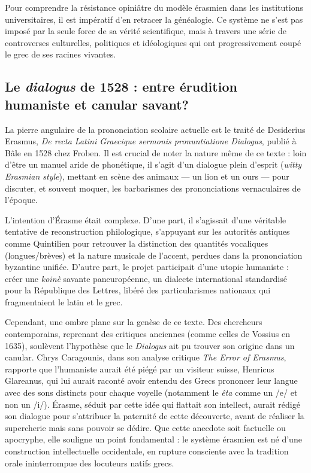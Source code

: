 Pour comprendre la résistance opiniâtre du modèle érasmien dans les institutions universitaires, il
est impératif d'en retracer la généalogie. Ce système ne s'est pas imposé par la seule force de sa
vérité scientifique, mais à travers une série de controverses culturelles, politiques et
idéologiques qui ont progressivement coupé le grec de ses racines vivantes.



\subsection{Le \textit{dialogus} de 1528 : entre érudition humaniste et canular savant?}

La pierre angulaire de la prononciation scolaire actuelle est le traité de Desiderius Erasmus,
\textit{De recta Latini Graecique sermonis pronuntiatione Dialogus}, publié à Bâle en 1528 chez
Froben.\cite{ref1} Il est crucial de noter la nature même de ce texte : loin d'être un manuel aride
de phonétique, il s'agit d'un dialogue plein d'esprit (\textit{witty Erasmian style}), mettant en
scène des animaux — un lion et un ours — pour discuter, et souvent moquer, les \og barbarismes\fg{}
des prononciations vernaculaires de l'époque.\cite{ref1}

L'intention d'Érasme était complexe. D'une part, il s'agissait d'une véritable tentative de
reconstruction philologique, s'appuyant sur les autorités antiques comme Quintilien pour retrouver
la distinction des quantités vocaliques (longues/brèves) et la nature musicale de l'accent, perdues
dans la prononciation byzantine unifiée.\cite{ref1} D'autre part, le projet participait d'une utopie
humaniste : créer une \textit{koinè} savante paneuropéenne, un dialecte international standardisé
pour la \og République des Lettres\fg{}, libéré des particularismes nationaux qui fragmentaient le
latin et le grec.\cite{ref1}

Cependant, une ombre plane sur la genèse de ce texte. Des chercheurs contemporains, reprenant des
critiques anciennes (comme celles de Vossius en 1635), soulèvent l'hypothèse que le
\textit{Dialogus} ait pu trouver son origine dans un canular. Chrys Caragounis, dans son analyse
critique \textit{The Error of Erasmus}, rapporte que l'humaniste aurait été piégé par un visiteur
suisse, Henricus Glareanus, qui lui aurait raconté avoir entendu des Grecs prononcer leur langue
avec des sons distincts pour chaque voyelle (notamment le \textit{êta} comme un /e/ et non un /i/).
Érasme, séduit par cette idée qui flattait son intellect, aurait rédigé son dialogue pour
s'attribuer la paternité de cette \og découverte\fg{}, avant de réaliser la supercherie mais sans
pouvoir se dédire.\cite{ref4} Que cette anecdote soit factuelle ou apocryphe, elle souligne un point
fondamental : le système érasmien est né d'une construction intellectuelle occidentale, en rupture
consciente avec la tradition orale ininterrompue des locuteurs natifs grecs.



